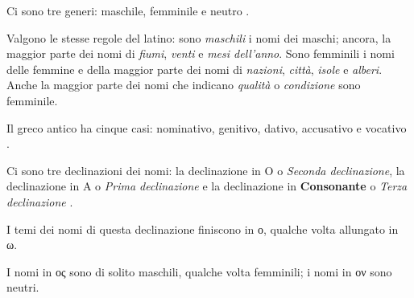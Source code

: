 \documentclass[nols]{tufte-handout}
\newcommand{\didobf}[1]{{\GFSDidotBf #1}}
\begin{document}
 Ci sono tre generi: maschile, femminile e neutro
.

 Valgono le stesse regole del latino: sono \textit{maschili} i nomi dei maschi; ancora, la maggior parte dei nomi di
\textit{fiumi}, \textit{venti} e \textit{mesi dell'anno}. Sono femminili i nomi delle femmine e della maggior parte dei nomi di 
\textit{nazioni}, \textit{città}, \textit{isole} e \textit{alberi}.
Anche la maggior parte dei nomi che indicano \textit{qualità} o \textit{condizione} sono femminile.  

 Il greco antico ha cinque casi: nominativo, genitivo, dativo, accusativo e vocativo
.
 
 Ci sono tre declinazioni dei nomi: la declinazione in \didobf{O} o \textit{Seconda declinazione}, 
la declinazione in \didobf{A} o \textit{Prima declinazione} 
e la declinazione in \textbf{Consonante} o \textit{Terza declinazione}
.

 I temi dei nomi di questa declinazione finiscono in \didobf{ο}, qualche volta allungato in \didobf{ω}.
 
 I nomi in \didobf{ος} sono di solito maschili, qualche volta femminili; i nomi in \didobf{ον} sono neutri.

\newpage

\end{document}
